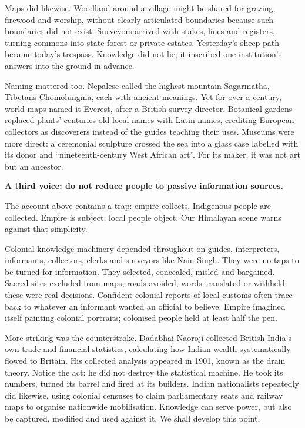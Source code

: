 Maps did likewise. Woodland around a village might be shared for grazing, firewood and worship, without clearly articulated boundaries because such boundaries did not exist. Surveyors arrived with stakes, lines and registers, turning commons into state forest or private estates. Yesterday's sheep path became today's trespass. Knowledge did not lie; it inscribed one institution's answers into the ground in advance.

Naming mattered too. Nepalese called the highest mountain Sagarmatha, Tibetans Chomolungma, each with ancient meanings. Yet for over a century, world maps named it Everest, after a British survey director. Botanical gardens replaced plants' centuries-old local names with Latin names, crediting European collectors as discoverers instead of the guides teaching their uses. Museums were more direct: a ceremonial sculpture crossed the sea into a glass case labelled with its donor and ``nineteenth-century West African art''. For its maker, it was not art but an ancestor.

\textbf{A third voice: do not reduce people to passive information sources.}

The account above contains a trap: empire collects, Indigenous people are collected. Empire is subject, local people object. Our Himalayan scene warns against that simplicity.

Colonial knowledge machinery depended throughout on guides, interpreters, informants, collectors, clerks and surveyors like Nain Singh. They were no taps to be turned for information. They selected, concealed, misled and bargained. Sacred sites excluded from maps, roads avoided, words translated or withheld: these were real decisions. Confident colonial reports of local customs often trace back to whatever an informant wanted an official to believe. Empire imagined itself painting colonial portraits; colonised people held at least half the pen.

More striking was the counterstroke. Dadabhai Naoroji collected British India's own trade and financial statistics, calculating how Indian wealth systematically flowed to Britain. His collected analysis appeared in 1901, known as the drain theory. Notice the act: he did not destroy the statistical machine. He took its numbers, turned its barrel and fired at its builders. Indian nationalists repeatedly did likewise, using colonial censuses to claim parliamentary seats and railway maps to organise nationwide mobilisation. Knowledge can serve power, but also be captured, modified and used against it. We shall develop this point.

